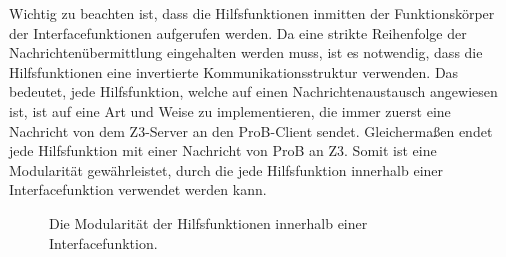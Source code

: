 Wichtig zu beachten ist, dass die Hilfsfunktionen inmitten der Funktionskörper der Interfacefunktionen aufgerufen werden.
Da eine strikte Reihenfolge der Nachrichtenübermittlung eingehalten werden muss, ist es notwendig, dass die Hilfsfunktionen
eine invertierte Kommunikationsstruktur verwenden.
Das bedeutet, jede Hilfsfunktion, welche auf einen Nachrichtenaustausch angewiesen ist, ist auf eine Art und Weise zu implementieren,
die immer zuerst eine Nachricht von dem Z3-Server an den ProB-Client sendet.
Gleichermaßen endet jede Hilfsfunktion mit einer Nachricht von ProB an Z3.
Somit ist eine Modularität gewährleistet, durch die jede Hilfsfunktion innerhalb einer Interfacefunktion verwendet werden kann.

\begin{figure}[!htp]
    \centering
    \caption{Die Modularität der Hilfsfunktionen innerhalb einer Interfacefunktion.}
    \label{fig:help_modular}
\end{figure}

